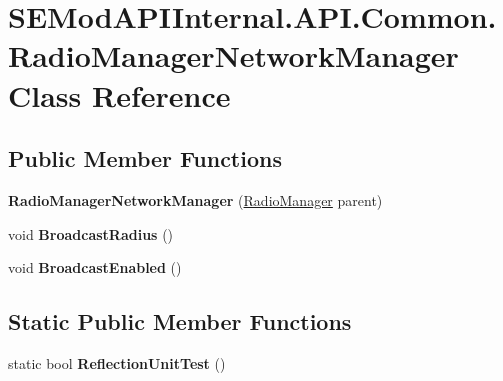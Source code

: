 \hypertarget{class_s_e_mod_a_p_i_internal_1_1_a_p_i_1_1_common_1_1_radio_manager_network_manager}{}\section{S\+E\+Mod\+A\+P\+I\+Internal.\+A\+P\+I.\+Common.\+Radio\+Manager\+Network\+Manager Class Reference}
\label{class_s_e_mod_a_p_i_internal_1_1_a_p_i_1_1_common_1_1_radio_manager_network_manager}
\subsection*{Public Member Functions}
\begin{DoxyCompactItemize}
\item 
\hypertarget{class_s_e_mod_a_p_i_internal_1_1_a_p_i_1_1_common_1_1_radio_manager_network_manager_a0f0728f05bb11ccf0859587db92f8f21}{}{\bfseries Radio\+Manager\+Network\+Manager} (\hyperlink{class_s_e_mod_a_p_i_internal_1_1_a_p_i_1_1_common_1_1_radio_manager}{Radio\+Manager} parent)\label{class_s_e_mod_a_p_i_internal_1_1_a_p_i_1_1_common_1_1_radio_manager_network_manager_a0f0728f05bb11ccf0859587db92f8f21}

\item 
\hypertarget{class_s_e_mod_a_p_i_internal_1_1_a_p_i_1_1_common_1_1_radio_manager_network_manager_a446293725530f0a635602e760a031bda}{}void {\bfseries Broadcast\+Radius} ()\label{class_s_e_mod_a_p_i_internal_1_1_a_p_i_1_1_common_1_1_radio_manager_network_manager_a446293725530f0a635602e760a031bda}

\item 
\hypertarget{class_s_e_mod_a_p_i_internal_1_1_a_p_i_1_1_common_1_1_radio_manager_network_manager_ad585cbb98f01f87c0fd56476914ec3ad}{}void {\bfseries Broadcast\+Enabled} ()\label{class_s_e_mod_a_p_i_internal_1_1_a_p_i_1_1_common_1_1_radio_manager_network_manager_ad585cbb98f01f87c0fd56476914ec3ad}

\end{DoxyCompactItemize}
\subsection*{Static Public Member Functions}
\begin{DoxyCompactItemize}
\item 
\hypertarget{class_s_e_mod_a_p_i_internal_1_1_a_p_i_1_1_common_1_1_radio_manager_network_manager_a764770b63665aa88905bc95f0178a825}{}static bool {\bfseries Reflection\+Unit\+Test} ()\label{class_s_e_mod_a_p_i_internal_1_1_a_p_i_1_1_common_1_1_radio_manager_network_manager_a764770b63665aa88905bc95f0178a825}

\end{DoxyCompactItemize}
